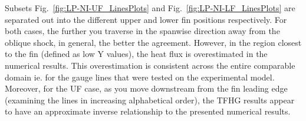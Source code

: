 \documentclass{AIAA}
\begin{document}
Subsets Fig.~\ref{fig:LP-NI-UF_LinesPlots} and Fig.~\ref{fig:LP-NI-LF_LinesPlots} are separated out into the different upper and lower fin positions respectively.
For both cases, the further you traverse in the spanwise direction away from the oblique shock, in general, the better the agreement.
However, in the region closest to the fin (defined as low Y values), the heat flux is overestimated in the numerical results.
This overestimation is consistent across the entire comparable domain ie. for the gauge lines that were tested on the experimental model.
Moreover, for the UF case, as you move downstream from the fin leading edge (examining the lines in increasing alphabetical order), the TFHG results appear to have an approximate inverse relationship to the presented numerical results.
\end{document}
